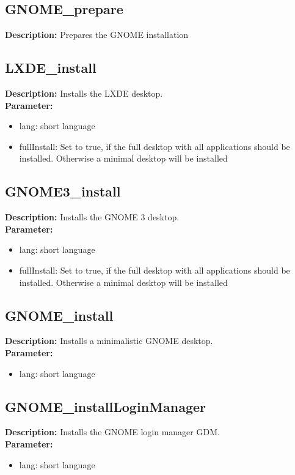 \subsection{GNOME\_prepare}
\textbf{Description:} Prepares the GNOME installation\\

\subsection{LXDE\_install}
\textbf{Description:} Installs the LXDE desktop.\\
\textbf{Parameter:}
\begin{itemize}
\item lang: short language
\item fullInstall: Set to true, if the full desktop with all applications should be installed. Otherwise a minimal desktop will be installed
\end{itemize}

\subsection{GNOME3\_install}
\textbf{Description:} Installs the GNOME 3 desktop.\\
\textbf{Parameter:}
\begin{itemize}
\item lang: short language
\item fullInstall: Set to true, if the full desktop with all applications should be installed. Otherwise a minimal desktop will be installed
\end{itemize}

\subsection{GNOME\_install}
\textbf{Description:} Installs a minimalistic GNOME desktop.\\
\textbf{Parameter:}
\begin{itemize}
\item lang: short language
\end{itemize}

\subsection{GNOME\_installLoginManager}
\textbf{Description:} Installs the GNOME login manager GDM.\\
\textbf{Parameter:}
\begin{itemize}
\item lang: short language
\end{itemize}

